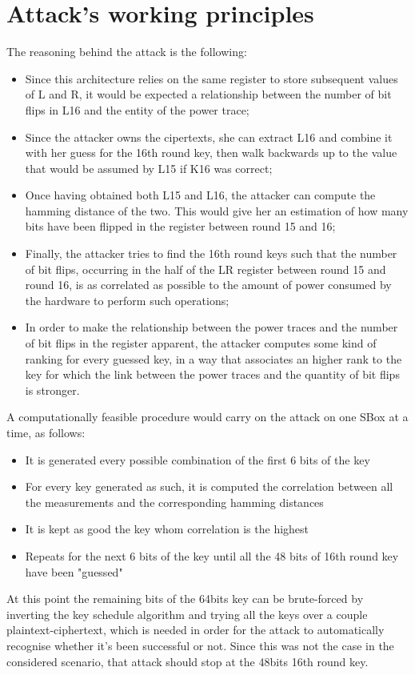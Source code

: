 \documentclass[11pt]{article} %
\begin{document}
\section{Attack's working principles}
The reasoning behind the attack is the following: 
\begin{itemize}
  \item Since this architecture relies on the same register to store subsequent values of L and R, it would be expected a relationship between the number of bit flips in L16 and the entity of the power trace;
  \item Since the attacker owns the cipertexts, she can extract L16 and combine it with her guess for the 16th round key, then  walk backwards up to the value that would be assumed by L15 if K16 was correct;
  \item Once having obtained both L15 and L16, the attacker can compute the hamming distance of the two. This would give her an estimation of how many bits have been flipped in the register between round 15 and 16;
  \item Finally, the attacker tries to find the 16th round keys such that the number of bit flips, occurring in the half of the LR register between round 15 and round 16, is as correlated as possible to the amount of power consumed by the hardware to perform such operations;
  \item In order to make the relationship between the power traces and the number of bit flips in the register apparent, the attacker computes some kind of ranking for every guessed key, in a way that associates an higher rank to the key for which the link between the power traces and the quantity of bit flips is stronger.
\end{itemize}
A computationally feasible procedure would carry on the attack on one SBox at a time, as follows:
\begin{itemize}
	\item It is generated every possible combination of the first 6 bits of the key
	\item For every key generated as such, it is computed the correlation between all the measurements and the corresponding hamming distances
	\item It is kept as good the key whom correlation is the highest 
	\item Repeats for the next 6 bits of the key until all the 48 bits of 16th round key have been "guessed"
\end{itemize}
At this point the remaining bits of the 64bits key can be brute-forced by inverting the key schedule algorithm and trying all the keys over a couple plaintext-ciphertext, which is needed in order for the attack to automatically recognise whether it's been successful or not. Since this was not the case in the considered scenario, that attack should stop at the 48bits 16th round key. 
\end{document}

